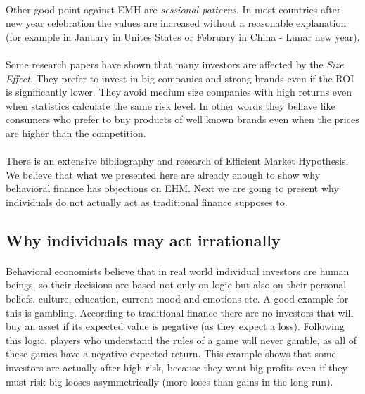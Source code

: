 \documentclass{article}
\begin{document}
\paragraph{ }
Other good point against EMH are \emph{sessional patterns}. In most countries after new year celebration the values are increased without a reasonable explanation (for example in January in Unites States or February in China - Lunar new year). 
\paragraph{ }
Some research papers have shown that many investors are affected by the \emph{ Size Effect}. They prefer to invest in big companies and strong brands even if the ROI is significantly lower. They avoid medium size companies with high returns even when statistics calculate the same risk level. In other words they behave like consumers who prefer to buy products of well known brands even when the prices are higher than the competition.
\paragraph{ }
There is an extensive bibliography and research of Efficient Market Hypothesis. We believe that what we presented here are already enough to show why behavioral finance has objections on EHM. Next we are going to present why individuals do not actually act as traditional finance supposes to.

\subsection{Why individuals may act irrationally}
\paragraph{ }
Behavioral economists believe that in real world individual investors are human beings, so their decisions are based not only on logic but also on their personal beliefs, culture, education, current mood and emotions etc. A good example for this is gambling. According to traditional finance there are no investors that will buy an asset if its expected value is negative (as they expect a loss). Following this logic, players who understand the rules of a game will never gamble, as all of these games have a negative expected return. This example shows that some investors are actually after high risk, because they want big profits even if they must risk big looses asymmetrically (more loses than gains in the long run).
\end{document}

